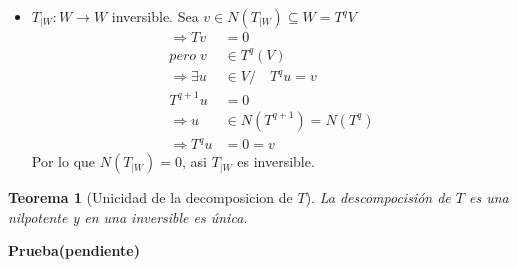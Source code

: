 \documentclass[10pt,a4paper]{article}
\newtheorem{mytheo}{Teorema}
\begin{document}
\begin{itemize}
\begin{itemize}
			Entonces $N(T^{q-1}) \neq 0$, pues si $N(T^{q-1}) = 0$ implicaria que $N(T^{q}) = 0$. Para probar esto supongamos que $N(T^{q})\neq 0$.
			$$\exists v\in N(T^{q}), v\neq 0/\quad T^{q}v = 0$$
			\begin{align*}
				T^{q-1}(Tv) &= 0\\
				Tv \in N(T^{q-1}) &= \{0\}\\
				Tv & = 0\\
				v & \in N(T)\subseteq N(T^{q-1})\\
				v &\in N(T^{q-1})
			\end{align*}
			Contradice que $N(T^{q-1}) = 0$, por lo que $N(T^{q}) = 0$
			\begin{equation}\label{minimalidad_index}
				\Rightarrow N(T^{q-1}) = N(T^{q})
			\end{equation}
			Pero $(\ref{minimalidad_index})$, contradice la minimalidad de $q\in\mathbb{N}$
			$$\therefore N(T^{q-1})\neq 0$$
			Así tenemos $T^{q} v = 0,\quad\forall v\in U\quad\wedge\quad\exists u\in U/\quad T^{q-1}u\neq 0$
			$$\Rightarrow T_{|U}^{q-1}\neq 0\quad\wedge\quad T_{U}^{q} = 0$$
			$\therefore T_{|U}$ es nilpotente de indice $q$.
			
			\item $T_{|W}:W\rightarrow W$ inversible.
			Sea $v\in N(T_{|W})\subseteq W = T^{q}V$
			\begin{align*}
				\Rightarrow Tv &= 0\\
				pero\; v &\in T^{q}(V)\\
				\Rightarrow \exists u &\in V/\quad T^{q}u = v\\
				T^{q+1}u &= 0\\
				\Rightarrow u &\in N(T^{q+1}) = N(T^{q})\\
				\Rightarrow T^{q}u &= 0 = v
			\end{align*}
			Por lo que $N(T_{|W}) = 0$, asi $T_{|W} $ es inversible.
		\end{itemize}
\end{itemize}


\begin{mytheo}[Unicidad de la decomposicion de $T$]
La descompocisión de $T$ es una nilpotente y en una inversible es única.	
\end{mytheo}

\textbf{Prueba(pendiente)}\\
\end{document}
